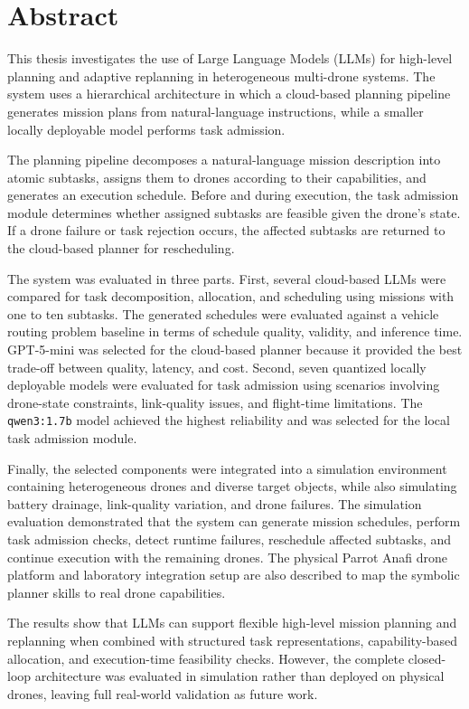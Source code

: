 \chapter*{Abstract}

This thesis investigates the use of Large Language Models (LLMs) for high-level planning and
adaptive replanning in heterogeneous multi-drone systems. The system uses a hierarchical
architecture in which a cloud-based planning pipeline generates mission plans from natural-language
instructions, while a smaller locally deployable model performs task admission.

The planning pipeline decomposes a natural-language mission description into atomic subtasks, assigns them to drones
according to their capabilities, and generates an execution schedule. Before and during execution, the task 
admission module determines whether assigned subtasks are feasible given the drone's state. 
If a drone failure or task rejection occurs, the affected subtasks are returned to the cloud-based planner for rescheduling.

The system was evaluated in three parts. First, several cloud-based LLMs were compared for task
decomposition, allocation, and scheduling using missions with one to ten subtasks. The generated
schedules were evaluated against a vehicle routing problem baseline in terms of schedule quality,
validity, and inference time. GPT-5-mini was selected for the cloud-based planner because it provided
the best trade-off between quality, latency, and cost. Second, seven quantized locally
deployable models were evaluated for task admission using scenarios involving drone-state constraints, link-quality issues, and flight-time limitations.
The \texttt{qwen3:1.7b} model achieved the highest reliability and was selected for the local task admission module.

Finally, the selected components were integrated into a simulation environment containing
heterogeneous drones and diverse target objects, while also simulating battery drainage,
link-quality variation, and drone failures. The simulation evaluation demonstrated that the system
can generate mission schedules, perform task admission checks, detect runtime failures,
reschedule affected subtasks, and continue execution with the remaining drones. The physical Parrot Anafi
drone platform and laboratory integration setup are also described to map the symbolic planner
skills to real drone capabilities.

The results show that LLMs can support flexible high-level mission planning and replanning when
combined with structured task representations, capability-based allocation, and execution-time
feasibility checks. However, the complete closed-loop architecture was evaluated in simulation rather
than deployed on physical drones, leaving full real-world validation as future work.